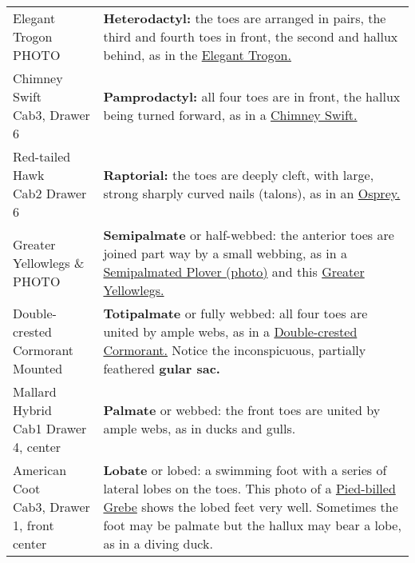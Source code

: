 \documentclass[10pt]{article}
\newif\ifprintkey
\newcommand{\PrintKey}[1]{\ifprintkey{\textbf{#1}}\fi}
\begin{document}
\begin{longtable}{@{}C{0.45\textwidth}L{0.45\textwidth}@{}}
%
\PrintKey{Elegant Trogon \newline PHOTO} & 
\textbf{Heterodactyl:} the toes are arranged in pairs, the third and fourth toes in front, the second and hallux behind, as in the \href{https://www.allaboutbirds.org/guide/Elegant_Trogon}{Elegant Trogon.} \\ [2.5cm]
%
\PrintKey{Chimney Swift \newline Cab3, Drawer 6} & 
\textbf{Pamprodactyl:} all four toes are in front, the hallux being turned forward, as in a \href{https://www.allaboutbirds.org/guide/Chimney_Swift}{Chimney Swift.}\\ [2.5cm]
%
\PrintKey{Red-tailed Hawk \newline Cab2 Drawer 6} & 
\textbf{Raptorial:} the toes are deeply cleft, with large, strong sharply curved nails (talons), as in an \href{https://www.allaboutbirds.org/guide/Osprey}{Osprey.} \\ [2.5cm]
%
\PrintKey{Greater Yellowlegs \& \newline PHOTO} & 
\textbf{Semipalmate} or half-webbed: the anterior toes are joined part way by a small webbing, as in a \href{https://www.allaboutbirds.org/guide/Semipalmated_Plover}{Semipalmated Plover (photo)} and this \href{https://www.allaboutbirds.org/guide/Greater_Yellowlegs}{Greater Yellowlegs.} \\ [2.5cm]
%
\PrintKey{Double-crested Cormorant \newline Mounted} & 
\textbf{Totipalmate} or fully webbed: all four toes are united by ample webs, as in a \href{https://www.allaboutbirds.org/guide/Double-crested_Cormorant}{Double-crested Cormorant.} Notice the inconspicuous, partially feathered \textbf{gular sac.} \\ [2.5cm]
%
\PrintKey{Mallard Hybrid \newline Cab1 Drawer 4, center} & 
\textbf{Palmate} or webbed: the front toes are united by ample webs, as in ducks and gulls. \\ [2.5cm]
%
\PrintKey{American Coot \newline Cab3, Drawer 1, front center} & 
\textbf{Lobate} or lobed: a swimming foot with a series of lateral lobes on the toes. This photo of a \href{https://www.allaboutbirds.org/guide/Pied-billed_Grebe/media-browser/63919971}{Pied-billed Grebe} shows the lobed feet very well. Sometimes the foot may be palmate but the hallux may bear a lobe, as in a diving duck. \\ [2.5cm]
%

\bottomrule
\end{longtable}
\end{document}
